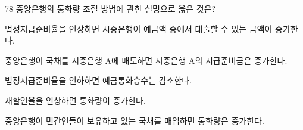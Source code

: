 \begin{question}{78}
중앙은행의 통화량 조절 방법에 관한 설명으로 옳은 것은?
\begin{choices}
  \item 법정지급준비율을 인상하면 시중은행이 예금액 중에서 대출할 수 있는 금액이 증가한다.
  \item 중앙은행이 국채를 시중은행 A에 매도하면 시중은행 A의 지급준비금은 증가한다.
  \item 법정지급준비율을 인하하면 예금통화승수는 감소한다.
  \item 재할인율을 인상하면 통화량이 증가한다.
  \item 중앙은행이 민간인들이 보유하고 있는 국채를 매입하면 통화량은 증가한다.
\end{choices}
\end{question}
